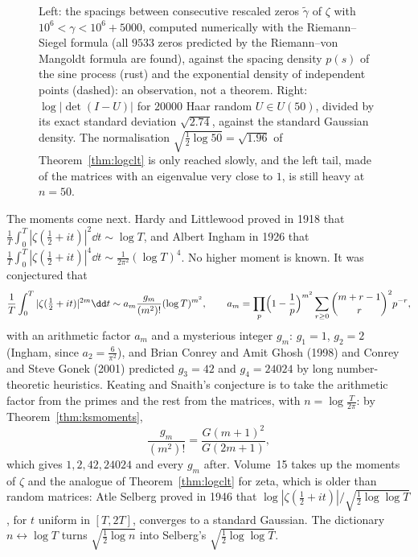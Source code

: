 \begin{figure}[ht]
\centering
{}
\caption{Left: the spacings between consecutive rescaled zeros $\tilde\gamma$ of $\zeta$ with $10^6<\gamma<10^6+5000$, computed numerically with the Riemann--Siegel formula (all $9533$ zeros predicted by the
Riemann--von Mangoldt formula are found), against the spacing density $p(s)$ of the sine process (rust) and the exponential density of independent points (dashed): an observation, not a theorem. Right: $\log|\det(I-U)|$ for $20000$ Haar random $U\in U(50)$, divided
by its exact standard deviation $\sqrt{2.74}$, against the standard Gaussian density. The normalisation $\sqrt{\frac12\log50}=\sqrt{1.96}$ of Theorem~\ref{thm:logclt} is only reached slowly, and the left tail, made of the matrices
with an eigenvalue very close to $1$, is still heavy at $n=50$.}
\label{fig:zeta}
\end{figure}

The moments come next. Hardy and Littlewood proved in 1918 that $\frac1T\int_0^T|\zeta(\frac12+it)|^2\dd t\sim\log T$, and Albert Ingham in 1926 that $\frac1T\int_0^T|\zeta(\frac12+it)|^4\dd t\sim\frac1{2\pi^2}(\log T)^4$. No higher moment is known. It was
conjectured that
\[
\frac1T\int_0^T|\zeta(\tfrac12+it)|^{2m}\dd t\sim a_m\frac{g_m}{(m^2)!}(\log T)^{m^2},\qquad a_m=\prod_p\Bigl(1-\frac1p\Bigr)^{m^2}\sum_{r\ge0}\binom{m+r-1}r^2p^{-r},
\]
with an arithmetic factor $a_m$ and a mysterious integer $g_m$: $g_1=1$, $g_2=2$ (Ingham, since $a_2=\frac6{\pi^2}$), and Brian Conrey and Amit Ghosh (1998) and Conrey and Steve Gonek (2001) predicted $g_3=42$ and
$g_4=24024$ by long number-theoretic heuristics. Keating and Snaith's conjecture is to take the arithmetic factor from the primes and the rest from the matrices, with $n=\log\frac T{2\pi}$: by Theorem~\ref{thm:ksmoments},
\[
\frac{g_m}{(m^2)!}=\frac{G(m+1)^2}{G(2m+1)},
\]
which gives $1,2,42,24024$ and every $g_m$ after. Volume~15 takes up the moments of $\zeta$ and the analogue of Theorem~\ref{thm:logclt} for zeta, which is older than random matrices: Atle Selberg proved in 1946 that
$\log|\zeta(\frac12+it)|/\sqrt{\frac12\log\log T}$, for $t$ uniform in $[T,2T]$, converges to a standard Gaussian. The dictionary $n\leftrightarrow\log T$ turns $\sqrt{\frac12\log n}$ into Selberg's $\sqrt{\frac12\log\log T}$.


